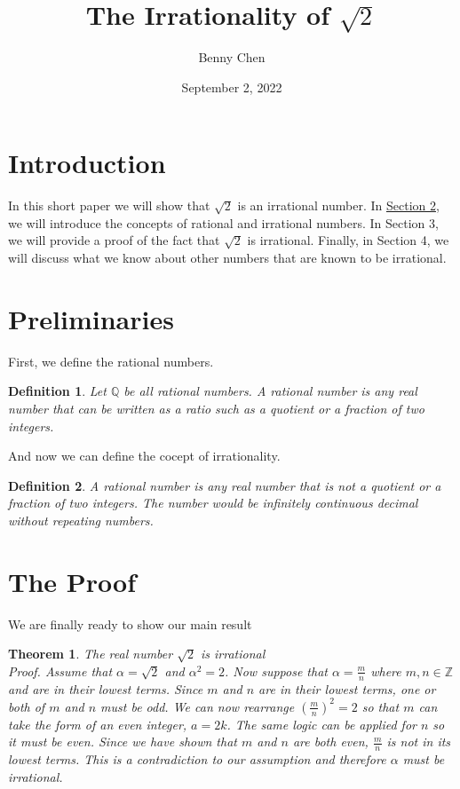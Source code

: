 \documentclass{article}
\title{The Irrationality of $\sqrt{2}$}
\author{Benny Chen}
\date{September 2, 2022}
\newtheorem{Definition}{Definition}
\newtheorem{Theorem}{Theorem}
\begin{document}
\maketitle

\section{Introduction}
In this short paper we will show that $\sqrt{2}$ is an irrational number. 
In \hyperref[sec:Preliminaries]{Section 2}, we 
will introduce the concepts of rational and irrational numbers. In Section 3, 
we will provide a proof of the fact that $\sqrt{2}$ is irrational. Finally, in 
Section 4, we will discuss what we know about other numbers that are known to be irrational.

\section{Preliminaries}
\label{sec:Preliminaries}
First, we define the rational numbers.
\begin{Definition}
Let $\mathbb{Q}$ be all rational numbers. A rational number is any real number that can be written as a 
ratio such as a quotient or a fraction of two integers.

\end{Definition}
And now we can define the cocept of irrationality.

\begin{Definition}
A rational number is any real number that is not a quotient or a fraction of two integers. The number
would be infinitely continuous decimal without repeating numbers.
\end{Definition}

\section{The Proof}
We are finally ready to show our main result
\begin{Theorem}
    The real number $\sqrt{2}$ is irrational\\
    Proof. 
    Assume that $\alpha = \sqrt{2}$ and $\alpha^{2} = 2$. Now suppose that $\alpha = \frac{m}{n}$ where
    $m, n \in \mathbb{Z}$ and are in their lowest terms. Since $m$ and $n$ are in their lowest terms,
    one or both of $m$ and $n$ must be odd. We can now rearrange $(\frac{m}{n})^2 = 2$ so that $m$ can 
    take the form of an even integer, $a = 2k$. The same logic can be applied for $n$ so it must be even. Since we 
    have shown that $m$ and $n$ are both even, $\frac{m}{n}$ is not in its lowest terms. This is a
    contradiction to our assumption and therefore $\alpha$ must be irrational.
\end{Theorem}
 
\end{document}
